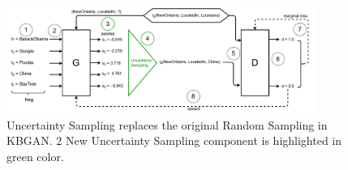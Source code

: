 \begin{figure}[H]
  \centering
    \includegraphics[width=0.90\textwidth]{figures/ucgan_architecture.pdf}
  \caption{Uncertainty Sampling replaces the original Random Sampling in \ac{KBGAN}. 
2  New Uncertainty Sampling component is highlighted in green color.}
  \label{fig:uncertainty_sampling_architecture}
\end{figure}